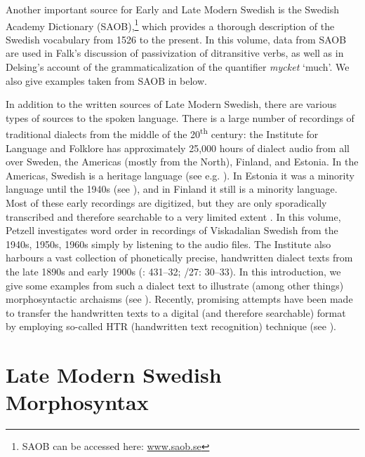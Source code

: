 \documentclass[output=paper]{langscibook}
\begin{document}
Another important source for Early and Late Modern Swedish is the Swedish Academy Dictionary (SAOB),\footnote{SAOB can be accessed here: \href{http://www.saob.se}{{www.saob.se}}} which provides a thorough description of the Swedish vocabulary from 1526 to the present. In this volume, data from SAOB are used in Falk’s discussion of passivization of ditransitive verbs, as well as in Delsing’s account of the grammaticalization of the quantifier \textit{mycket} ‘much’. We also give examples taken from SAOB in  below.



In addition to the written sources of Late Modern Swedish, there are various types of sources to the spoken language. There is a large number of recordings of traditional dialects from the middle of the 20\textsuperscript{th} century: the Institute for Language and Folklore has approximately 25,000 hours of dialect audio from all over Sweden, the Americas (mostly from the North), Finland, and Estonia. In the Americas, Swedish is a heritage language (see e.g. \citealt{Larsson2015}). In Estonia it was a minority language until the 1940s (see \citealt{Rosenkvist2018}), and in Finland it still is a minority language. Most of these early recordings are digitized, but they are only sporadically transcribed and therefore searchable to a very limited extent \citep{BergEtAl2019}. In this volume, Petzell investigates word order in recordings of Viskadalian Swedish from the 1940s, 1950s, 1960s simply by listening to the audio files. The Institute also harbours a vast collection of phonetically precise, handwritten dialect texts from the late 1890s and early 1900s (\citealt{Sellberg1993}: 431–32; \citealt{SOU1924}/27: 30–33). In this introduction, we give some examples from such a dialect text to illustrate (among other things) morphosyntactic archaisms (see ). Recently, promising attempts have been made to transfer the handwritten texts to a digital (and therefore searchable) format by employing so-called HTR (handwritten text recognition) technique (see \citealt{Petzell2019,Petzell2020, Petzell2019}).


\section{Late Modern Swedish Morphosyntax}\label{sec:intro:3}
\end{document}
